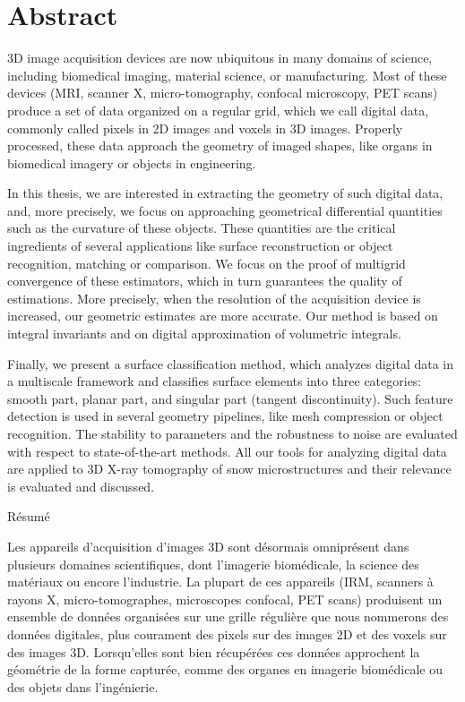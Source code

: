 %
\chapter*{Abstract}
\label{sec:abstract}
\vspace*{-10mm}

3D image acquisition devices are now ubiquitous in many domains of science,
including biomedical imaging, material science, or manufacturing. Most of these
devices (MRI, scanner X, micro-tomography, confocal microscopy, PET scans)
produce a set of data organized on a regular grid, which we call digital data,
commonly called pixels in 2D images and voxels in 3D images. Properly processed,
these data approach the geometry of imaged shapes, like organs in biomedical
imagery or objects in engineering.

In this thesis, we are interested in extracting the geometry of such digital
data, and, more precisely, we focus on approaching geometrical differential
quantities such as the curvature of these objects. These quantities are the
critical ingredients of several applications like surface reconstruction or
object recognition, matching or comparison. We focus on the proof of multigrid
convergence of these estimators, which in turn guarantees the quality of
estimations. More precisely, when the resolution of the acquisition device is
increased, our geometric estimates are more accurate. Our method is based on
integral invariants and on digital approximation of volumetric integrals.

Finally, we present a surface classification method, which analyzes digital data
in a multiscale framework and classifies surface elements into three categories:
smooth part, planar part, and singular part (tangent discontinuity). Such
feature detection is used in several geometry pipelines, like mesh compression
or object recognition. The stability to parameters and the robustness to noise
are evaluated with respect to state-of-the-art methods. All our tools for
analyzing digital data are applied to 3D X-ray tomography of snow
microstructures and their relevance is evaluated and discussed.

\vspace*{20mm}

{Résumé}
\label{sec:abstract-french}
\vspace*{5mm}

Les appareils d'acquisition d'images 3D sont désormais omniprésent dans
plusieurs domaines scientifiques, dont l'imagerie biomédicale, la science des
matériaux ou encore l'industrie. La plupart de ces appareils (IRM, scanners à
rayons X, micro-tomographes, microscopes confocal, PET scans) produisent un
ensemble de données organisées sur une grille régulière que nous nommerons des
données digitales, plus courament des pixels sur des images 2D et des voxels sur
des images 3D. Lorsqu'elles sont bien récupérées ces données approchent la
géométrie de la forme capturée, comme des organes en imagerie biomédicale ou des
objets dans l'ingénierie.

